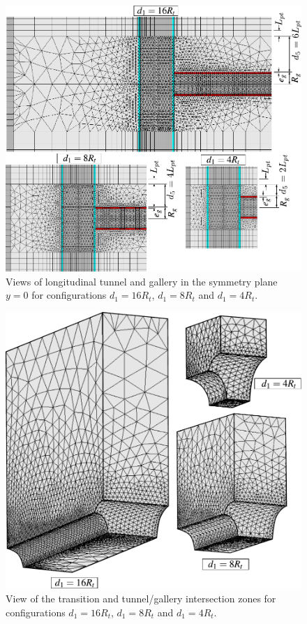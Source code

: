 \documentclass[a4paper,fleqn]{cas-sc}
\begin{document}
\begin{figure}[h!]
	\centering
	\includegraphics[scale=0.6]{Mesh4.pdf}
	\caption{Views of longitudinal tunnel and gallery in the symmetry plane $y=0$ for configurations $d_1=16R_t$, $d_1=8R_t$ and $d_1=4R_t$.}
	\label{Mesh4}
\end{figure}
\begin{figure}[h!]
	\centering
	\includegraphics[scale=0.6]{Mesh5.pdf}
	\caption{View of the transition and tunnel/gallery intersection zones for configurations $d_1=16R_t$, $d_1=8R_t$ and $d_1=4R_t$.}
	\label{Mesh5}
\end{figure}
\FloatBarrier
\end{document}
